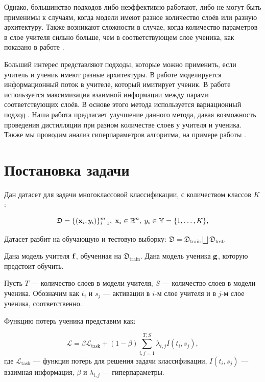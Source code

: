 \documentclass[14]{article}
\begin{document}
Однако, большинство подходов либо неэффективно работают, либо не могут быть применимы к случаям, когда модели имеют разное количество слоёв или разную архитектуру.
Также возникают сложности в случае, когда количество параметров в слое учителя сильно больше,
чем в соответствующем слое ученика, как показано в работе \cite{mirzadeh2020improved}.

Больший интерес представляют подходы, которые можно применить, если учитель и ученик имеют разные архитектуры.
В работе \cite{passalis2020heterogeneous} моделируется информационный поток в учителе, который имитирует ученик.
В работе \cite{Ahn_2019_CVPR} используется максимизация взаимной информации между парами соответствующих слоёв.
В основе этого метода используется вариационный подход \cite{barber2004algorithm}.
Наша работа предлагает улучшение данного метода, давая возможность проведения дистилляции при разном количестве слоев у учителя и ученика.
Также мы проводим анализ гиперпараметров алгоритма, на примере работы \cite{gorpinich2022gradient}.

\section{Постановка задачи}

Дан датасет для задачи многоклассовой классификации, с количеством классов $K$:

$$\mathfrak{D}  = \{(\bold{x}_i, y_i)\}_{i=1}^{m},\; \bold{x}_i \in \mathbb{R}^n,\; y_i \in \mathbb{Y}  = \{1, \dots, K\},$$

Датасет разбит на обучающую и тестовую выборку: $\mathfrak{D} = \mathfrak{D}_\text{train} \bigsqcup \mathfrak{D}_\text{test}$.

Дана модель учителя $\bold{f}$, обученная на $\mathfrak{D}_\text{train}$.
Дана модель ученика $\bold{g}$, которую предстоит обучить.

Пусть $T$ --- количество слоев в модели учителя, $S$ --- количество слоев в модели ученика.
Обозначим как $t_i$ и $s_j$ --- активации в $i$-м слое учителя и в $j$-м слое ученика, соответственно.

Функцию потерь ученика представим как:

$$
  \mathcal{L} = \beta \mathcal{L}_\text{task} + (1 - \beta){\sum_{i, j=1}^{T, S}\lambda_{i, j}I(t_{i}, s_{j})},
$$
\noindent
где $\mathcal{L}_\text{task}$ --- функция потерь для решения задачи классификации,
$I(t_{i}, s_{j})$ --- взаимная информация, $\beta$ и $\lambda_{i, j}$ --- гиперпараметры.
\end{document}
